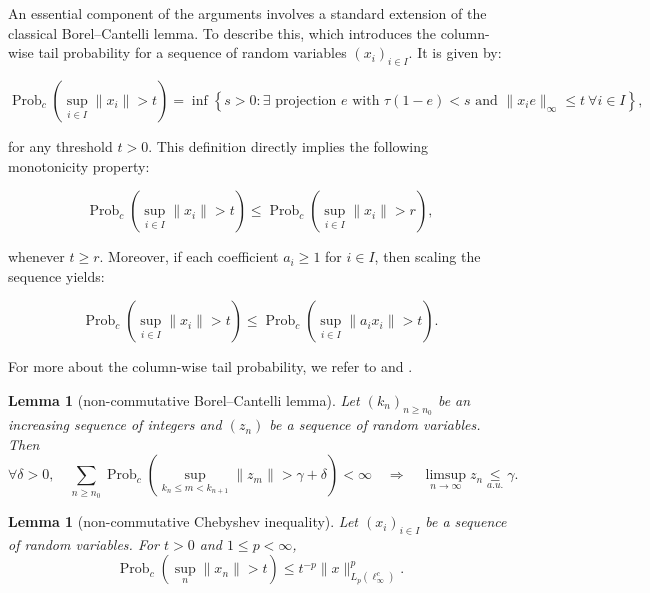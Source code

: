 \documentclass[10pt]{amsart}
\newtheorem{lem}[thm]{Lemma}
\theoremstyle{definition}
\theoremstyle{myremark}
\numberwithin{equation}{section}
\begin{document}
An essential component of the arguments involves a standard extension of the classical Borel–Cantelli lemma. To describe this,  which introduces the column-wise tail probability for a sequence of random variables $(x_i)_{i \in I}$. It is given by:

$$
\operatorname{Prob}_c\left( \sup_{i \in I} \|x_i\| > t \right) 
= \inf \left\{ s > 0 : \exists \text{ projection } e \text{ with } \tau(1 - e) < s \text{ and } \|x_i e\|_\infty \leq t \ \forall i \in I \right\},
$$

for any threshold $t > 0$. This definition directly implies the following monotonicity property:

$$
\operatorname{Prob}_c\left( \sup_{i \in I} \|x_i\| > t \right) 
\leq 
\operatorname{Prob}_c\left( \sup_{i \in I} \|x_i\| > r \right),
$$

whenever $t \geq r$. Moreover, if each coefficient $a_i \geq 1$ for $i \in I$, then scaling the sequence yields:

\begin{equation}\label{scaling}
\operatorname{Prob}_c\left( \sup_{i \in I} \|x_i\| > t \right) 
\leq 
\operatorname{Prob}_c\left( \sup_{i \in I} \|a_i x_i\| > t \right).
\end{equation}

For more about the column-wise tail probability, we refer to \cite{konwerska2008law} and  \cite{zeng2015kolmogorov}.



\begin{lem}[non-commutative Borel--Cantelli lemma]\cite[Lemma 3.17]{konwerska2008law}\label{lem: Borel-Cantelli lemma}
    Let $(k_n)_{n \geq n_0}$ be an increasing sequence of integers and $(z_n)$ be a sequence of random variables. Then 
    $$
    \forall \delta>0, \quad \sum_{n \geq n_0} \operatorname{Prob}_c\left( \sup_{k_n\leq m< k_{n+1}} \|z_m\| > \gamma + \delta \right) < \infty
\quad \Longrightarrow\quad \limsup_{n \to \infty} z_n \underset{a.u.}{\leq } \gamma.
    $$
\end{lem}


\begin{lem}[non-commutative Chebyshev inequality]\cite[Lemma 3.16]{konwerska2008law}\label{lem: Chebyshev inequality lemma}
    Let $(x_i)_{i \in I}$ be a sequence of random variables. For $t > 0$ and $1 \leq p < \infty$,
    $$
    \operatorname{Prob}_c\left( \sup_n \|x_n\| > t \right) \leq t^{-p} \|x\|_{L_p(\ell_\infty^c)}^p.
    $$
\end{lem}
\end{document}

